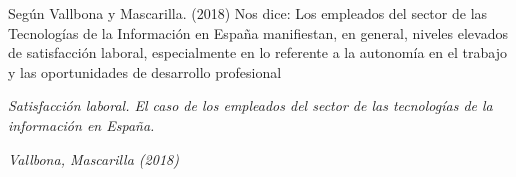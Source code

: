   Según Vallbona y Mascarilla. (2018) Nos dice: Los empleados del sector de las Tecnologías de la Información en España manifiestan, en general, niveles elevados de satisfacción laboral, especialmente en lo referente a la autonomía en el trabajo y las oportunidades de desarrollo profesional

  \begin{flushright}
    \textit{Satisfacción laboral. El caso de los empleados del sector de las tecnologías de la información en España.}
    \cite{CrespiMascarilla}
  \end{flushright}
  \begin{flushright}
    \textit{Vallbona, Mascarilla (2018)}
  \end{flushright}
